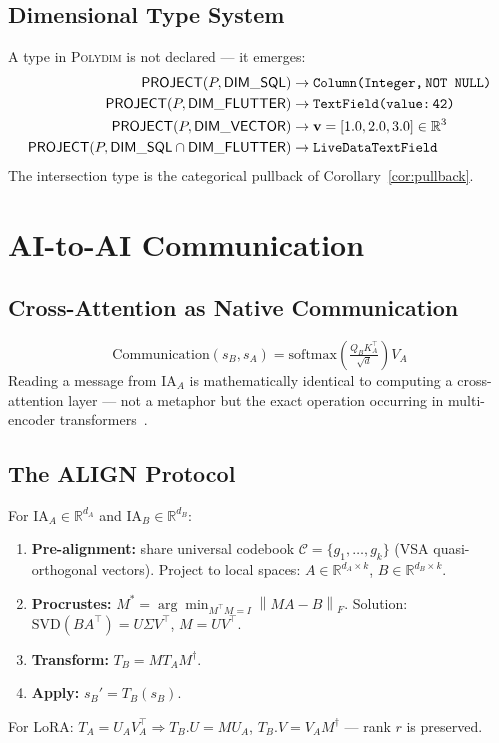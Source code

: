 \documentclass[10pt,twocolumn]{article}
\theoremstyle{plain}
\theoremstyle{definition}
\theoremstyle{remark}
\newcommand{\RR}{\mathbb{R}}
\newcommand{\Project}{\mathsf{PROJECT}}
\newcommand{\norm}[1]{\left\|#1\right\|}
\begin{document}
\subsection{Dimensional Type System}

A type in \textsc{Polydim} is not declared --- it emerges:
\begin{align*}
\Project(P,\mathsf{DIM\_SQL})     &\to \texttt{Column(Integer,\,NOT NULL)}\\
\Project(P,\mathsf{DIM\_FLUTTER}) &\to \texttt{TextField(value:\,42)}\\
\Project(P,\mathsf{DIM\_VECTOR})  &\to \mathbf{v}=[1.0,2.0,3.0]\in\RR^3\\
\Project(P,\mathsf{DIM\_SQL}\cap\mathsf{DIM\_FLUTTER})
  &\to \texttt{LiveDataTextField}
\end{align*}
The intersection type is the categorical pullback of Corollary~\ref{cor:pullback}.

\section{AI-to-AI Communication}

\subsection{Cross-Attention as Native Communication}

\[
  \mathrm{Communication}(s_B,s_A)
  = \mathrm{softmax}\!\left(\tfrac{Q_B K_A^\top}{\sqrt{d}}\right)V_A
\]
Reading a message from $\mathrm{IA}_A$ is mathematically identical to
computing a cross-attention layer --- not a metaphor but the exact operation
occurring in multi-encoder transformers~\citep{oneill2025endofunctor}.

\subsection{The ALIGN Protocol}

For $\mathrm{IA}_A\in\RR^{d_A}$ and $\mathrm{IA}_B\in\RR^{d_B}$:
\begin{enumerate}[noitemsep,label=\arabic*.]
\item \textbf{Pre-alignment:} share universal codebook $\mathcal{C}=\{g_1,\ldots,g_k\}$
  (VSA quasi-orthogonal vectors). Project to local spaces: $A\in\RR^{d_A\times k}$,
  $B\in\RR^{d_B\times k}$.
\item \textbf{Procrustes:} $M^*=\arg\min_{M^\top M=I}\norm{MA-B}_F$.
  Solution: $\mathrm{SVD}(BA^\top)=U\Sigma V^\top$, $M=UV^\top$.
\item \textbf{Transform:} $T_B=MT_AM^\dagger$.
\item \textbf{Apply:} $s_B'=T_B(s_B)$.
\end{enumerate}
For LoRA: $T_A=U_AV_A^\top\Rightarrow T_B.U=MU_A$, $T_B.V=V_AM^\dagger$ ---
rank $r$ is preserved.
\end{document}
